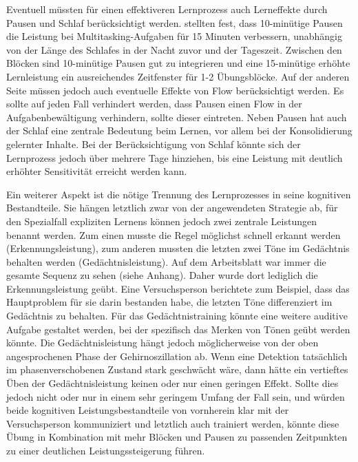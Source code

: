 \documentclass[doc,a4paper,12pt]{apa6}
\begin{document}
Eventuell müssten für einen effektiveren Lernprozess auch Lerneffekte durch Pausen und Schlaf berücksichtigt werden. \textcite{sallinen2008recovery} stellten fest, dass 10-minütige Pausen die Leistung bei Multitasking-Aufgaben für 15 Minuten verbessern, unabhängig von der Länge des Schlafes in der Nacht zuvor und der Tageszeit. Zwischen den Blöcken sind 10-minütige Pausen gut zu integrieren und eine 15-minütige erhöhte Lernleistung ein ausreichendes Zeitfenster für 1-2 Übungsblöcke. Auf der anderen Seite müssen jedoch auch eventuelle Effekte von Flow \parencite{nakamura2002concept} berücksichtigt werden. Es sollte auf jeden Fall verhindert werden, dass Pausen einen Flow in der Aufgabenbewältigung verhindern, sollte dieser eintreten. Neben Pausen hat auch der Schlaf \parencite{diekelmann2010memory} eine zentrale Bedeutung beim Lernen, vor allem bei der Konsolidierung gelernter Inhalte. Bei der Berücksichtigung von Schlaf könnte sich der Lernprozess jedoch über mehrere Tage hinziehen, bis eine Leistung mit deutlich erhöhter Sensitivität erreicht werden kann.

Ein weiterer Aspekt ist die nötige Trennung des Lernprozesses in seine kognitiven Bestandteile. Sie hängen letztlich zwar von der angewendeten Strategie ab, für den Spezialfall expliziten Lernens können jedoch zwei zentrale Leistungen benannt werden. Zum einen musste die Regel möglichst schnell erkannt werden (Erkennungsleistung), zum anderen mussten die letzten zwei Töne im Gedächtnis behalten werden (Gedächtnisleistung). Auf dem Arbeitsblatt war immer die gesamte Sequenz zu sehen (siehe Anhang). Daher wurde dort lediglich die Erkennungsleistung geübt. Eine Versuchsperson berichtete zum Beispiel, dass das Hauptproblem für sie darin bestanden habe, die letzten Töne differenziert im Gedächtnis zu behalten. Für das Gedächtnistraining könnte eine weitere auditive Aufgabe gestaltet werden, bei der spezifisch das Merken von Tönen geübt werden könnte. Die Gedächtnisleistung hängt jedoch möglicherweise von der oben angesprochenen Phase der Gehirnoszillation ab. Wenn eine Detektion tatsächlich im phasenverschobenen Zustand stark geschwächt wäre, dann hätte ein vertieftes Üben der Gedächtnisleistung keinen oder nur einen geringen Effekt. Sollte dies jedoch nicht oder nur in einem sehr geringem Umfang der Fall sein, und würden beide kognitiven Leistungsbestandteile von vornherein klar mit der Versuchsperson kommuniziert und letztlich auch trainiert werden, könnte diese Übung in Kombination mit mehr Blöcken und Pausen zu passenden Zeitpunkten zu einer deutlichen Leistungssteigerung führen.
\end{document}
